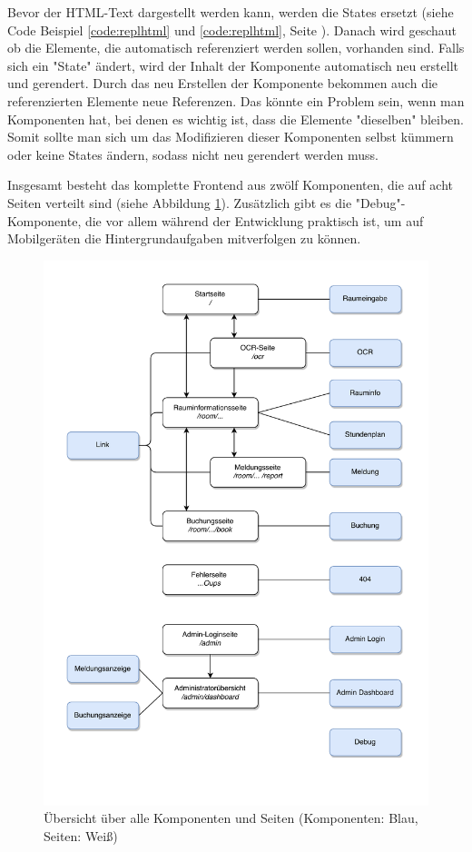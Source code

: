 Bevor der HTML-Text dargestellt werden kann, werden die States ersetzt (siehe Code Beispiel \ref{code:replhtml} und \ref{code:replhtml}, Seite \pageref{code:replhtml}). Danach wird geschaut ob die Elemente, die automatisch referenziert werden sollen, vorhanden sind. Falls sich ein "State" ändert, wird der Inhalt der Komponente automatisch neu erstellt und gerendert. Durch das neu Erstellen der Komponente bekommen auch die referenzierten Elemente neue Referenzen. Das könnte ein Problem sein, wenn man Komponenten hat, bei denen es wichtig ist, dass die Elemente "dieselben" bleiben. Somit sollte man sich um das Modifizieren dieser Komponenten selbst kümmern oder keine States ändern, sodass nicht neu gerendert werden muss.


Insgesamt besteht das komplette Frontend aus zwölf Komponenten, die auf acht Seiten verteilt sind (siehe Abbildung \ref{fig:comppageoverview}). Zusätzlich gibt es die "Debug"-Komponente, die vor allem während der Entwicklung praktisch ist, um auf Mobilgeräten die Hintergrundaufgaben mitverfolgen zu können.

\begin{figure}[H]
    \centering
    \includegraphics[width=150mm]{media/WebComponents/overview.svg.pdf}
    \caption{Übersicht über alle Komponenten und Seiten (Komponenten: Blau, Seiten: Weiß)}
    \label{fig:comppageoverview}
\end{figure}

